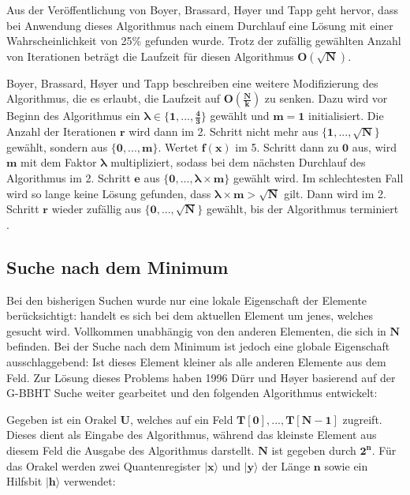 Aus der Veröffentlichung von Boyer, Brassard, Høyer und Tapp geht hervor, dass bei Anwendung dieses Algorithmus nach einem Durchlauf eine Lösung mit einer Wahrscheinlichkeit von 25\% gefunden wurde. 
Trotz der zufällig gewählten Anzahl von Iterationen beträgt die Laufzeit für diesen Algorithmus $\mathbf{O(\sqrt{N})}$.

Boyer, Brassard, Høyer und Tapp beschreiben eine weitere Modifizierung des Algorithmus, die es erlaubt, die Laufzeit auf $\mathbf{O(\frac{N}{k})}$ zu senken. 
Dazu wird vor Beginn des Algorithmus ein $\mathbf{\pmb\lambda \in \{1, ..., \frac{4}{3} \} }$ gewählt und $\mathbf{m = 1}$ initialisiert. Die Anzahl der Iterationen $\mathbf{r}$ wird dann im 2. Schritt nicht mehr aus $\mathbf{\{1, ..., \sqrt{N}\}}$ gewählt, sondern aus $\mathbf{\{0, ..., m\}}$. 
Wertet $\mathbf{f(x)}$ im 5. Schritt dann zu $\mathbf{0}$ aus, wird $\mathbf{m}$ mit dem Faktor $\mathbf{\pmb\lambda}$ multipliziert, sodass bei dem nächsten Durchlauf des Algorithmus im 2. Schritt $\mathbf{e}$ aus $\mathbf{\{0, ..., \pmb\lambda \times m\}}$  gewählt wird. 
Im schlechtesten Fall wird so lange keine Lösung gefunden, dass $\mathbf{\pmb\lambda \times m > \sqrt{N}}$ gilt. Dann wird im 2. Schritt $\mathbf{r}$ wieder zufällig aus $\mathbf{\{0, ..., \sqrt{N}\}}$ gewählt, bis der Algorithmus terminiert \cite[S. 141]{Ho99}.


\subsection{Suche nach dem Minimum} \label{minimum}
Bei den bisherigen Suchen wurde nur eine lokale Eigenschaft der Elemente berücksichtigt: handelt es sich bei dem aktuellen Element um jenes, welches gesucht wird. 
Vollkommen unabhängig von den anderen Elementen, die sich in $\mathbf{N}$ befinden. Bei der Suche nach dem Minimum ist jedoch eine globale Eigenschaft ausschlaggebend: Ist dieses Element kleiner als alle anderen Elemente aus dem Feld.
Zur Lösung dieses Problems haben 1996 Dürr und Høyer basierend auf der G-BBHT Suche weiter gearbeitet und den folgenden Algorithmus entwickelt: 

Gegeben ist ein Orakel $\mathbf{U}$, welches auf ein Feld $\mathbf{T[0], ..., T[N-1]}$ zugreift. 
Dieses dient als Eingabe des Algorithmus, während das kleinste Element aus diesem Feld die Ausgabe des Algorithmus darstellt. $\mathbf{N}$ ist gegeben durch $\mathbf{2^n}$. 
Für das Orakel werden zwei Quantenregister $\mathbf{|x\rangle}$ und $\mathbf{|y\rangle}$ der Länge $\mathbf{n}$ sowie ein Hilfsbit $\mathbf{|h\rangle}$ verwendet:

